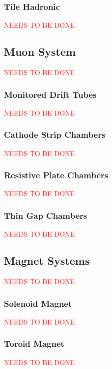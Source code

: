 		\subsubsection{Tile Hadronic}{
			\textcolor{red}{NEEDS TO BE DONE}
		}

	\subsection{Muon System}{
		\textcolor{red}{NEEDS TO BE DONE}
	}

		\subsubsection{Monitored Drift Tubes}{
			\textcolor{red}{NEEDS TO BE DONE}
		}

		\subsubsection{Cathode Strip Chambers}{
			\textcolor{red}{NEEDS TO BE DONE}
		}

		\subsubsection{Resistive Plate Chambers}{
			\textcolor{red}{NEEDS TO BE DONE}
		}

		\subsubsection{Thin Gap Chambers}{
			\textcolor{red}{NEEDS TO BE DONE}
		}

	\subsection{Magnet Systems}{
		\textcolor{red}{NEEDS TO BE DONE}
	}

		\subsubsection{Solenoid Magnet}{
			\textcolor{red}{NEEDS TO BE DONE}
		}

		\subsubsection{Toroid Magnet}{
			\textcolor{red}{NEEDS TO BE DONE}
		}

		